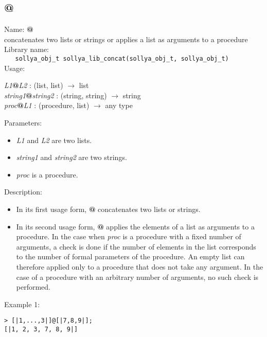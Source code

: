 \subsection{@}
\label{labconcat}
\noindent Name: \textbf{@}\\
\phantom{aaa}concatenates two lists or strings or applies a list as arguments to a procedure\\[0.2cm]
\noindent Library name:\\
\verb|   sollya_obj_t sollya_lib_concat(sollya_obj_t, sollya_obj_t)|\\[0.2cm]
\noindent Usage: 
\begin{center}
\emph{L1}\textbf{@}\emph{L2} : (\textsf{list}, \textsf{list}) $\rightarrow$ \textsf{list}\\
\emph{string1}\textbf{@}\emph{string2} : (\textsf{string}, \textsf{string}) $\rightarrow$ \textsf{string}\\
\emph{proc}\textbf{@}\emph{L1} : (\textsf{procedure}, \textsf{list}) $\rightarrow$ \textsf{any type}\\
\end{center}
Parameters: 
\begin{itemize}
\item \emph{L1} and \emph{L2} are two lists.
\item \emph{string1} and \emph{string2} are two strings.
\item \emph{proc} is a procedure.
\end{itemize}
\noindent Description: \begin{itemize}

\item In its first usage form, \textbf{@} concatenates two lists or strings.

\item In its second usage form, \textbf{@} applies the elements of a list as
   arguments to a procedure. In the case when \emph{proc} is a procedure 
   with a fixed number of arguments, a check is done if the number of
   elements in the list corresponds to the number of formal parameters
   of the procedure. An empty list can therefore applied only to a 
   procedure that does not take any argument. In the case of a 
   procedure with an arbitrary number of arguments, no such check is 
   performed.
\end{itemize}
\noindent Example 1: 
\begin{center}\begin{minipage}{15cm}\begin{Verbatim}[frame=single]
> [|1,...,3|]@[|7,8,9|];
[|1, 2, 3, 7, 8, 9|]
\end{Verbatim}
\end{minipage}\end{center}
